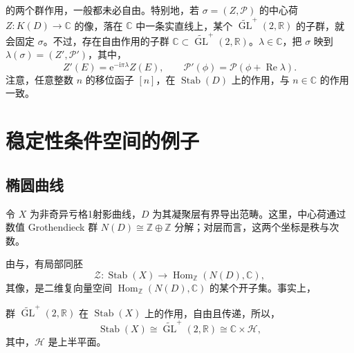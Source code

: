 的两个群作用，一般都未必自由。特别地，若 $\sigma=(Z,\mathcal{P})$ 的中心荷 $Z\colon K(D)\to\mathbb{C}$ 的像，落在 $\mathbb{C}$ 中一条实直线上，某个 $\widetilde{\operatorname{GL}}^{+}(2,\mathbb{R})$ 的子群，就会固定 $\sigma$。不过，存在自由作用的子群 $\mathbb{C}\subset\widetilde{\operatorname{GL}}^{+}(2,\mathbb{R})$。$\lambda\in\mathbb{C}$，把 $\sigma$ 映到 $\lambda(\sigma)=(Z',\mathcal{P}')$，其中，
\[
Z'(E)=\mathrm{e}^{-\mathrm{i}\pi\lambda}Z(E),\qquad
\mathcal{P}'(\phi)=\mathcal{P}(\phi+\operatorname{Re}\lambda).
\]
注意，任意整数 $n$ 的移位函子 $[n]$，在 $\operatorname{Stab}(D)$ 上的作用，与 $n\in\mathbb{C}$ 的作用一致。

\section{稳定性条件空间的例子}\label{sec:5.8}

\subsection{椭圆曲线}\label{sec:5.8.1}

令 $X$ 为非奇异亏格1射影曲线，$D$ 为其凝聚层有界导出范畴。这里，中心荷通过数值 Grothendieck 群 $N(D)\cong\mathbb{Z}\oplus\mathbb{Z}$ 分解；对层而言，这两个坐标是秩与次数。

由与，有局部同胚
\[
\mathcal{Z}\colon\operatorname{Stab}(X)
\longrightarrow\operatorname{Hom}_{\mathbb{Z}}(N(D),\mathbb{C}),
\]
其像，是二维复向量空间 $\operatorname{Hom}_{\mathbb{Z}}(N(D),\mathbb{C})$ 的某个开子集。事实上，
\begin{theorem}\label{thm:5.40}
群 $\widetilde{\operatorname{GL}}^{+}(2,\mathbb{R})$ 在 $\operatorname{Stab}(X)$ 上的作用，自由且传递，所以，
\[
\operatorname{Stab}(X)\cong\widetilde{\operatorname{GL}}^{+}(2,\mathbb{R})
\cong\mathbb{C}\times\mathcal{H},
\]
其中，$\mathcal{H}$ 是上半平面。
\end{theorem}

